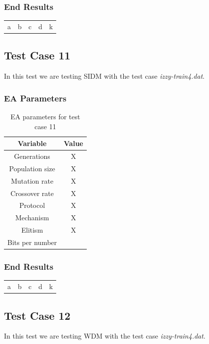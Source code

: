 \subsubsection{End Results}\label{sec:test-case-10-results}
\begin{table}
	\begin{tabular}{c c c c c}
		a & b & c & d & k \\
	\end{tabular}
\end{table}

\subsection{Test Case 11}\label{sec:test-case-11}
In this test we are testing SIDM with the test case
\textit{izzy-train4.dat}.
\subsubsection{EA Parameters}\label{sec:test-case-11-parameters}
\begin{table}
	\begin{tabular}{c c}
		Variable & Value \\
		\hline
		Generations & X \\
		\hline
		Population size & X \\
		\hline
		Mutation rate & X \\
		\hline
		Crossover rate & X \\
		\hline
		Protocol & X \\
		\hline
		Mechanism & X \\
		\hline
		Elitism & X \\
		\hline
		Bits per number & \\
	\end{tabular}
	\caption{EA parameters for test case 11}
\end{table}
\subsubsection{End Results}\label{sec:test-case-11-results}
\begin{table}
	\begin{tabular}{c c c c c}
		a & b & c & d & k \\
	\end{tabular}
\end{table}

\subsection{Test Case 12}\label{sec:test-case-12}
In this test we are testing WDM with the test case
\textit{izzy-train4.dat}.
